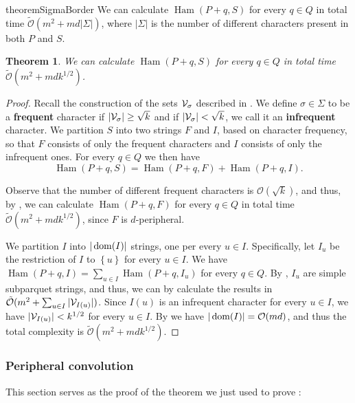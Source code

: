 \documentclass[11pt]{article}
\renewcommand{\O}{\mathcal{O}}
\newcommand{\tO}{\tilde{\mathcal{O}}}
\newcommand{\set}[1]{\left\lbrace #1 \right\rbrace}
\theoremstyle{plain}
\newtheorem{theorem}{Theorem}
\theoremstyle{definition}
\theoremstyle{remark}
\DeclareMathOperator*{\Ham}{Ham}
\begin{document}
\begin{restatable*}{theorem}{SigmaBorder}\label{sigma_border}
	We can calculate $\Ham(P + q, S)$ for every $q \in Q$ in total time $\tO(m^2 + md |\Sigma|)$, where $|\Sigma|$ is the number of different characters present in both $P$ and $S$.
\end{restatable*}

\begin{theorem}\label{dense_algo}
	We can calculate $\Ham(P + q, S)$ for every $q \in Q$ in total time $\tO(m^2 + mdk^{1/2})$.
\end{theorem}
\begin{proof}
	Recall the construction of the sets $\mathcal{V}_\sigma$ described in .
	We define $\sigma \in \Sigma$ to be a \textbf{frequent} character if $|\mathcal{V}_\sigma| \ge \sqrt{k}$ and if $|\mathcal{V}_\sigma| < \sqrt{k}$, we call it an \textbf{infrequent} character.
	We partition $S$ into two strings $F$ and $I$, based on character frequency,
	so that $F$ consists of only the frequent characters and $I$ consists of only the infrequent ones.
	For every $q \in Q$ we then have 
	\[\Ham(P + q, S) = \Ham(P + q, F) + \Ham(P + q, I).\]
	
	Observe that the number of different frequent characters is $\O(\sqrt{k})$, and thus, by , we can calculate $\Ham(P + q, F)$ for every $q \in Q$ in total time $\tO(m^2 + mdk^{1/2})$, since $F$ is $d$-peripheral. 
	
	We partition $I$ into $|\operatorname*{dom}(I)|$ strings, one per every $u \in I$.
	Specifically, let $I_u$ be the restriction of $I$ to $\set{u}$ for every $u \in I$.
	We have $\Ham(P + q, I) = \sum_{u \in I} \Ham(P + q, I_u)$ for every $q \in Q$.
	By , $I_u$ are simple subparquet strings, and thus, we can by  calculate the results in $\tO(m^2 + \sum_{u \in I} |\V_{I(u)}|)$.
	Since $I(u)$ is an infrequent character for every $u \in I$, we have $|\mathcal{V}_{I(u)}| < k^{1/2}$ for every $u \in I$.
	By  we have $|\d{I}| = \O(md)$, and thus the total complexity is $\tO(m^2 + mdk^{1/2})$.
\end{proof}

\subsubsection{Peripheral convolution} \label{sigma_border_proof}

This section serves as the proof of the theorem we just used to prove :
\end{document}
